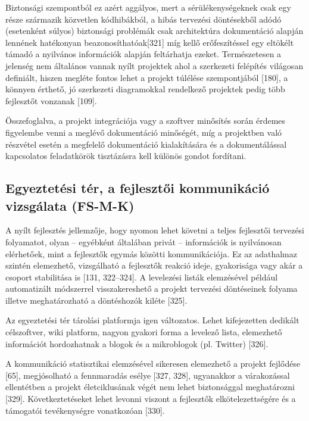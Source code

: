 \documentclass[12pt,magyar,a4paper,oneside]{scrreprt}
\begin{document}
Biztonsági szempontból ez azért aggályos, mert a sérülékenységeknek csak
egy része származik közvetlen kódhibákból, a hibás tervezési döntésekből
adódó (esetenként súlyos) biztonsági problémák csak architektúra
dokumentáció alapján lennének hatékonyan beazonosíthatóak{[}321{]} míg
kellő erőfeszítéssel egy eltökélt támadó a nyilvános információk alapján
feltárhatja ezeket. Természetesen a jelenség nem általános vannak nyílt
projektek ahol a szerkezeti felépítés világosan definiált, hiszen
megléte fontos lehet a projekt túlélése szempontjából {[}180{]}, a
könnyen érthető, jó szerkezeti diagramokkal rendelkező projektek pedig
több fejlesztőt vonzanak {[}109{]}.

Összefoglalva, a projekt integrációja vagy a szoftver minősítés során
érdemes figyelembe venni a meglévő dokumentáció minőségét, míg a
projektben való részvétel esetén a megfelelő dokumentáció kialakítására
és a dokumentálással kapcsolatos feladatkörök tisztázásra kell különös
gondot fordítani.

\hypertarget{sec:FS-M-K}{%
\subsection{Egyeztetési tér, a fejlesztői kommunikáció vizsgálata
(FS-M-K)}\label{sec:FS-M-K}}

A nyílt fejlesztés jellemzője, hogy nyomon lehet követni a teljes
fejlesztői tervezési folyamatot, olyan -- egyébként általában privát --
információk is nyilvánosan elérhetőek, mint a fejlesztők egymás közötti
kommunikációja. Ez az adathalmaz szintén elemezhető, vizsgálható a
fejlesztők reakció ideje, gyakorisága vagy akár a csoport stabilitása is
{[}131, 322--324{]}. A levelezési listák elemzésével például
automatizált módszerrel visszakereshető a projekt tervezési döntéseinek
folyama illetve meghatározható a döntéshozók kiléte {[}325{]}.

Az egyeztetési tér tárolási platformja igen változatos. Lehet
kifejezetten dedikált célszoftver, wiki platform, nagyon gyakori forma a
levelező lista, elemezhető információt hordozhatnak a blogok és a
mikroblogok (pl. Twitter) {[}326{]}.

A kommunikáció statisztikai elemzésével sikeresen elemezhető a projekt
fejlődése {[}65{]}, megjósolható a fennmaradás esélye {[}327, 328{]},
ugyanakkor a várakozással ellentétben a projekt életciklusának végét nem
lehet biztonsággal meghatározni {[}329{]}. Következtetéseket lehet
levonni viszont a fejlesztők elkötelezettségére és a támogatói
tevékenységre vonatkozóan {[}330{]}.
\end{document}
